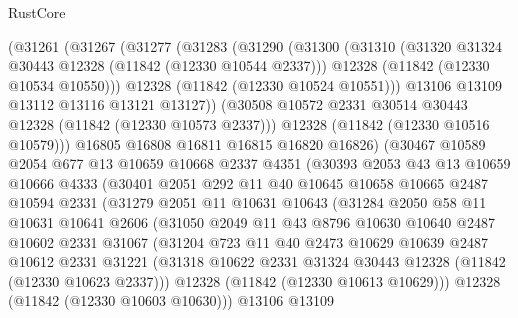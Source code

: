 \begin{lexlean}{RustCore}
\begin{coremodule}
        (@31261
          (@31267
            (@31277
              (@31283
                (@31290
                  (@31300
                    (@31310
                      (@31320 @31324 @30443 @12328 (@11842 (@12330 @10544 @2337)))
                      @12328
                      (@11842 (@12330 @10534 @10550)))
                    @12328
                    (@11842 (@12330 @10524 @10551)))
                  @13106
                  @13109
                  @13112
                  @13116
                  @13121
                  @13127))
              (@30508 @10572 @2331 @30514 @30443 @12328 (@11842 (@12330 @10573 @2337)))
              @12328
              (@11842 (@12330 @10516 @10579)))
            @16805
            @16808
            @16811
            @16815
            @16820
            @16826)
          (@30467
            @10589
            @2054
            @677
            @13
            @10659
            @10668
            @2337
            @4351
            (@30393
              @2053
              @43
              @13
              @10659
              @10666
              @4333
              (@30401
                @2051
                @292
                @11
                @40
                @10645
                @10658
                @10665
                @2487
                @10594
                @2331
                (@31279
                  @2051
                  @11
                  @10631
                  @10643
                  (@31284
                    @2050
                    @58
                    @11
                    @10631
                    @10641
                    @2606
                    (@31050
                      @2049
                      @11
                      @43
                      @8796
                      @10630
                      @10640
                      @2487
                      @10602
                      @2331
                      @31067
                      (@31204
                        @723
                        @11
                        @40
                        @2473
                        @10629
                        @10639
                        @2487
                        @10612
                        @2331
                        @31221
                        (@31318 @10622 @2331 @31324 @30443 @12328 (@11842 (@12330 @10623 @2337)))
                        @12328
                        (@11842 (@12330 @10613 @10629)))
                      @12328
                      (@11842 (@12330 @10603 @10630)))
                    @13106
                    @13109

\end{coremodule}
\end{lexlean}

